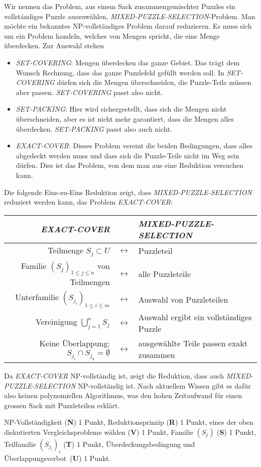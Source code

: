 \begin{loesung}
Wir nennen das Problem, aus einem Sack zusammengemischter Puzzles
ein vollständiges Puzzle auszuwählen, {\em MIXED-PUZZLE-SELECTION}-Problem.
Man möchte ein bekanntes NP-vollständiges Problem darauf reduzieren.
Es muss sich um ein Problem handeln, welches von Mengen spricht, die eine
Menge überdecken.
Zur Auswahl stehen
\begin{itemize}
\item
{\em SET-COVERING}: Mengen überdecken das ganze Gebiet.
Das trägt dem Wunsch Rechnung, dass das ganze Puzzlefeld gefüllt werden
soll.
In {\em SET-COVERING} dürfen sich die Mengen überschneiden, die
Puzzle-Teile müssen aber passen.
{\em SET-COVERING} passt also nicht.
\item
{\em SET-PACKING}: Hier wird sichergestellt, dass sich die
Mengen nicht überschneiden, aber es ist nicht mehr garantiert,
dass die Mengen alles überdecken.
{\em SET-PACKING} passt also auch nicht.
\item
{\em EXACT-COVER}: Dieses Problem vereint die beiden Bedingungen,
dass alles abgedeckt werden muss und dass sich die Puzzle-Teile
nicht im Weg sein dürfen.
Dies ist das Problem, von dem man aus eine Reduktion versuchen kann.
\end{itemize}

Die folgende Eins-zu-Eins Reduktion zeigt, dass {\em MIXED-PUZZLE-SELECTION}
reduziert werden kann, das Problem {\em EXACT-COVER}:
\begin{center}
\renewcommand{\arraystretch}{1.3}
\begin{tabular}{r>{$}c<{$}l}
{\em EXACT-COVER}&&{\em MIXED-PUZZLE-SELECTION}
\\
\hline
Teilmenge $S_j\subset U$
&\leftrightarrow&
Puzzleteil
\\
Familie $(S_j)_{1\le j\le n}$ von Teilmengen
&\leftrightarrow&
alle Puzzleteile
\\
Unterfamilie $(S_{j_i})_{1\le i\le m}$
&\leftrightarrow&
Auswahl von Puzzleteilen
\\
Vereinigung $\bigcup_{j=1}^n S_j$
&\leftrightarrow&
Auswahl ergibt ein vollständiges Puzzle
\\
Keine Überlappung: $S_{j_i}\cap S_{j_k}=\emptyset$
&\leftrightarrow&
ausgewählte Teile passen exakt zusammen
\end{tabular}
\end{center}
Da {\em EXACT-COVER} NP-vollständig ist, zeigt die Reduktion, dass
auch {\em MIXED-PUZZLE-SELECTION} NP-vollständig ist.
Nach aktuellem Wissen gibt es dafür also keinen polynomiellen
Algorithmus, was den hohen Zeitaufwand für einen grossen
Sack mit Puzzleteilen erklärt.
\end{loesung}

\begin{bewertung}
NP-Vollständigkeit ({\bf N}) 1 Punkt,
Reduktionsprinzip ({\bf R}) 1 Punkt,
eines der oben diskutierten Vergleichsprobleme wählen ({\bf V}) 1 Punkt,
Familie $(S_j)$ ({\bf S}) 1 Punkt,
Teilfamilie $(S_{j_i})_i$ ({\bf T}) 1 Punkt,
Überdeckungsbedingung und Überlappungsverbot ({\bf U}) 1 Punkt.
\end{bewertung}


